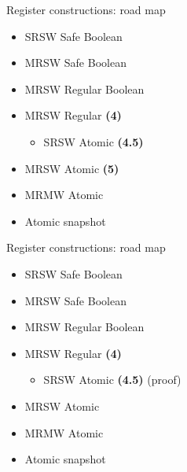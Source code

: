 \begin{frame}[noframenumbering]{Register constructions: road map}

\begin{itemize}
  \item SRSW Safe Boolean 
  \item MRSW Safe Boolean 
  \item MRSW Regular Boolean 
  \item MRSW Regular \textbf{(4)}
  \begin{itemize}
    \item SRSW Atomic \textbf{(4.5)}     
  \end{itemize}
  \item MRSW Atomic \textbf{(5)} 
  \item MRMW Atomic
  \item Atomic snapshot
\end{itemize}

\end{frame}


\begin{frame}[noframenumbering]{Register constructions: road map}

\begin{itemize}
  \item SRSW Safe Boolean 
  \item MRSW Safe Boolean 
  \item MRSW Regular Boolean 
  \item MRSW Regular \textbf{(4)}
  \begin{itemize}
    \item SRSW Atomic \textbf{(4.5)} (proof)
  \end{itemize}
  \item MRSW Atomic
  \item MRMW Atomic
  \item Atomic snapshot
\end{itemize}

\end{frame}

